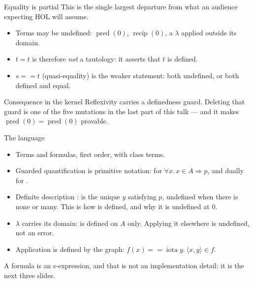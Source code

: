 \documentclass[11pt,aspectratio=169]{beamer}
\begin{document}
\begin{frame}{Equality is partial}
  This is the single largest departure from what an audience expecting HOL will
  assume.
  \begin{itemize}
    \item Terms may be undefined: $\operatorname{pred}(0)$,
          $\operatorname{recip}(0)$, a $\lambda$ applied outside its domain.
    \item $t = t$ is therefore \emph{not} a tautology: it asserts that $t$ is
          defined.
    \item $s == t$ (quasi-equality) is the weaker statement: both undefined,
          or both defined and equal.
  \end{itemize}
  \vfill
  \begin{block}{Consequence in the kernel}
    Reflexivity carries a definedness guard. Deleting that guard is one of the
    five mutations in the last part of this talk --- and it makes
    $\operatorname{pred}(0) = \operatorname{pred}(0)$ provable.
  \end{block}
\end{frame}

\begin{frame}{The language}
  \begin{itemize}
    \item Terms and formulas, first order, with class terms.
    \item Guarded quantification is primitive notation:
           for
          $\forall x.\, x \in A \Rightarrow p$, and dually for
          .
    \item Definite description :  is the unique
          $y$ satisfying $p$, undefined when there is none or many. This is how
           is defined, and why it is undefined at $0$.
    \item $\lambda$ carries its domain:  is defined
          on $A$ only. Applying it elsewhere is undefined, not an error.
    \item Application is defined by the graph:
          $f(x) == \operatorname{iota} y.\ \langle x,y\rangle \in f$.
  \end{itemize}
  \vfill
  \small A formula is an s-expression, and that is not an implementation
  detail: it is the next three slides.
\end{frame}
\end{document}
